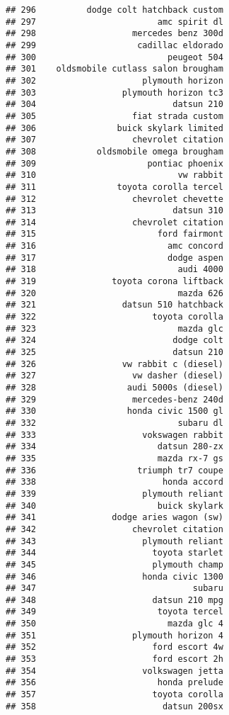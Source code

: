\documentclass[
]{article}
\begin{document}
\begin{verbatim}
## 296          dodge colt hatchback custom
## 297                        amc spirit dl
## 298                   mercedes benz 300d
## 299                    cadillac eldorado
## 300                          peugeot 504
## 301    oldsmobile cutlass salon brougham
## 302                     plymouth horizon
## 303                 plymouth horizon tc3
## 304                           datsun 210
## 305                   fiat strada custom
## 306                buick skylark limited
## 307                   chevrolet citation
## 308            oldsmobile omega brougham
## 309                      pontiac phoenix
## 310                            vw rabbit
## 311                toyota corolla tercel
## 312                   chevrolet chevette
## 313                           datsun 310
## 314                   chevrolet citation
## 315                        ford fairmont
## 316                          amc concord
## 317                          dodge aspen
## 318                            audi 4000
## 319               toyota corona liftback
## 320                            mazda 626
## 321                 datsun 510 hatchback
## 322                       toyota corolla
## 323                            mazda glc
## 324                           dodge colt
## 325                           datsun 210
## 326                 vw rabbit c (diesel)
## 327                   vw dasher (diesel)
## 328                  audi 5000s (diesel)
## 329                   mercedes-benz 240d
## 330                  honda civic 1500 gl
## 332                            subaru dl
## 333                     vokswagen rabbit
## 334                        datsun 280-zx
## 335                        mazda rx-7 gs
## 336                    triumph tr7 coupe
## 338                         honda accord
## 339                     plymouth reliant
## 340                        buick skylark
## 341               dodge aries wagon (sw)
## 342                   chevrolet citation
## 343                     plymouth reliant
## 344                       toyota starlet
## 345                       plymouth champ
## 346                     honda civic 1300
## 347                               subaru
## 348                       datsun 210 mpg
## 349                        toyota tercel
## 350                          mazda glc 4
## 351                   plymouth horizon 4
## 352                       ford escort 4w
## 353                       ford escort 2h
## 354                     volkswagen jetta
## 356                        honda prelude
## 357                       toyota corolla
## 358                         datsun 200sx

\end{verbatim}
\end{document}
